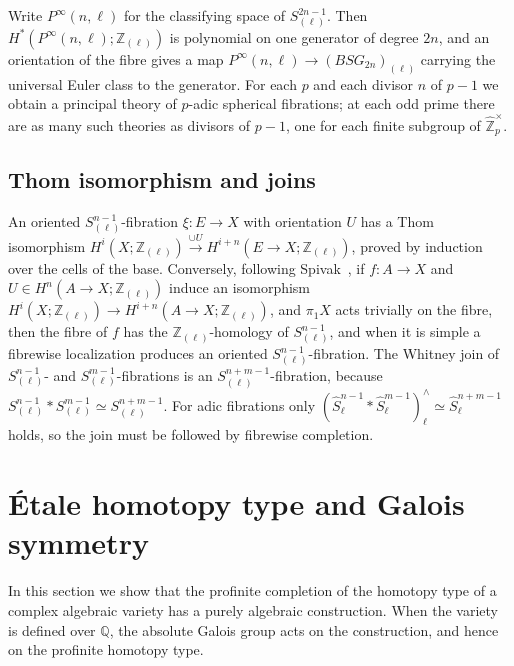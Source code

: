 \documentclass[11pt]{amsart}
\theoremstyle{plain}
\theoremstyle{definition}
\numberwithin{equation}{section}
\newcommand{\Q}{\mathbb{Q}}
\newcommand{\Zhat}{\widehat{\mathbb{Z}}}
\newcommand{\Zl}{\mathbb{Z}_{(\ell)}}
\newcommand{\units}{^{\times}}
\begin{document}
Write $P^\infty(n,\ell)$ for the classifying space of $S^{2n-1}_{(\ell)}$.
Then $H^*(P^\infty(n,\ell);\Zl)$ is polynomial on one generator of degree $2n$, and an orientation of the fibre gives a map $P^\infty(n,\ell)\to(BSG_{2n})_{(\ell)}$ carrying the universal Euler class to the generator.
For each $p$ and each divisor $n$ of $p-1$ we obtain a principal theory of $p$-adic spherical fibrations; at each odd prime there are as many such theories as divisors of $p-1$, one for each finite subgroup of $\Zhat_p\units$.

\subsection{Thom isomorphism and joins}
An oriented $S^{n-1}_{(\ell)}$-fibration $\xi\colon E\to X$ with orientation $U$ has a Thom isomorphism $H^i(X;\Zl)\xrightarrow{\cup U}H^{i+n}(E\to X;\Zl)$, proved by induction over the cells of the base.
Conversely, following Spivak~\cite{Spivak}, if $f\colon A\to X$ and $U\in H^n(A\to X;\Zl)$ induce an isomorphism $H^i(X;\Zl)\to H^{i+n}(A\to X;\Zl)$, and $\pi_1X$ acts trivially on the fibre, then the fibre of $f$ has the $\Zl$-homology of $S^{n-1}_{(\ell)}$, and when it is simple a fibrewise localization produces an oriented $S^{n-1}_{(\ell)}$-fibration.
The Whitney join of $S^{n-1}_{(\ell)}$- and $S^{m-1}_{(\ell)}$-fibrations is an $S^{n+m-1}_{(\ell)}$-fibration, because $S^{n-1}_{(\ell)}\ast S^{m-1}_{(\ell)}\simeq S^{n+m-1}_{(\ell)}$.
For adic fibrations only $(\widehat S^{n-1}_\ell\ast\widehat S^{m-1}_\ell)^\wedge_\ell\simeq\widehat S^{n+m-1}_\ell$ holds, so the join must be followed by fibrewise completion.


\section{\'Etale homotopy type and Galois symmetry}\label{sec:etale}

In this section we show that the profinite completion of the homotopy type of a complex algebraic variety has a purely algebraic construction.
When the variety is defined over $\Q$, the absolute Galois group acts on the construction, and hence on the profinite homotopy type.
\end{document}
